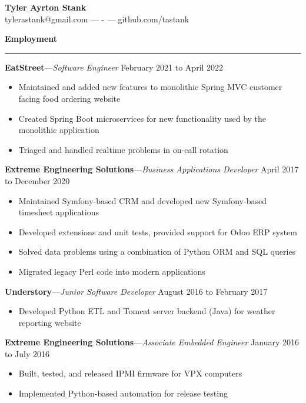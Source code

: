 \documentclass[12pt,letterpaper]{article}
\newenvironment{details}{
    \vspace{-.8em}
    \begin{itemize}
        \renewcommand \labelitemi{\labelitemiv}
        \setlength{\itemsep}{0pt}
        \setlength{\parskip}{-1pt}
        \setlength{\parsep}{0pt}
    }{
    \end{itemize}
    \vspace{-.5em}
}
\newcommand{\hr} {
    \vspace{-1em}
    \par\rule{\textwidth}{1pt}
    \vspace{-1.5em}
}
\newcommand{\ressection}[1] {
    \par{\large \textbf{#1}}
    \hr
}
\newenvironment{employment} {
    \setlength{\parskip}{0pt}
    \ressection{Employment}
}{
    \vspace{0.5em}
}
\newcommand{\employer}[3] {
    \vspace{3pt}
    {\par\textbf{#1}---\textit{#2} \hfill #3}
    \vspace{3pt}
    \par
}
\begin{document}
\thispagestyle{empty}

\begin{centering}
    {\huge \textbf{Tyler Ayrton Stank}}\\
    tylerastank@gmail.com ---  - --- github.com/tastank\\
\end{centering}


\begin{employment} 

\employer{EatStreet}{Software Engineer}{February 2021 to April 2022}
\begin{details}
    \item Maintained and added new features to monolithic Spring MVC customer facing food ordering website
    \item Created Spring Boot microservices for new functionality used by the monolithic application
    \item Triaged and handled realtime problems in on-call rotation
\end{details}

\employer{Extreme Engineering Solutions}{Business Applications Developer}{April 2017 to December 2020}
\begin{details}
    \item Maintained Symfony-based CRM and developed new Symfony-based timesheet applications
    \item Developed extensions and unit tests, provided support for Odoo ERP system
    \item Solved data problems using a combination of Python ORM and SQL queries
    \item Migrated legacy Perl code into modern applications
\end{details}

\employer{Understory}{Junior Software Developer}{August 2016 to February 2017}
\begin{details}
    \item Developed Python ETL and Tomcat server backend (Java) for weather reporting website
\end{details}

\employer{Extreme Engineering Solutions}{Associate Embedded Engineer}{January 2016 to July 2016}
\begin{details}
    \item Built, tested, and released IPMI firmware for VPX computers
    \item Implemented Python-based automation for release testing
\end{details}


\end{employment}
\end{document}

